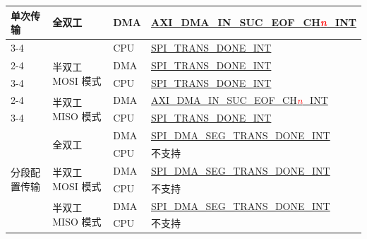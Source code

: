 \documentclass[main\_\_CN.tex]{subfiles}
\begin{document}
\begin{ThreePartTable}
\begin{longtable}[c]{|l|l|l|l|}
\multirow{6}{*}{单次传输} & \multirow{2}{*}{全双工} & DMA & \hyperref[int:GDMAINSUCEOFINT]{AXI\_DMA\_IN\_SUC\_EOF\_CH\textcolor{red}{\it{n}}\_INT} \tnote{1} \\ \cline{3-4}  
&& CPU & \hyperref[int:SPITRANSDONEINT]{SPI\_TRANS\_DONE\_INT} \tnote{2}  \\ \cline{2-4} 
& \multirow{2}{*}{半双工 MOSI 模式} & DMA & \hyperref[int:SPITRANSDONEINT]{SPI\_TRANS\_DONE\_INT} \\ \cline{3-4} 
&& CPU & \hyperref[int:SPITRANSDONEINT]{SPI\_TRANS\_DONE\_INT}  \\ \cline{2-4} 
& \multirow{2}{*}{半双工 MISO 模式} & DMA & \hyperref[int:GDMAINSUCEOFINT]{AXI\_DMA\_IN\_SUC\_EOF\_CH\textcolor{red}{\it{n}}\_INT} \\ \cline{3-4} 
&& CPU & \hyperref[int:SPITRANSDONEINT]{SPI\_TRANS\_DONE\_INT} \\ \hline
\multirow{6}{*}{分段配置传输} & \multirow{2}{*}{全双工} & DMA & \hyperref[int:SPIDMASEGTRANSDONEINT]{SPI\_DMA\_SEG\_TRANS\_DONE\_INT} \tnote{3} \\ \cline{3-4} 
&& CPU & 不支持       \\ \cline{2-4} 
& \multirow{2}{*}{半双工 MOSI 模式} & DMA  & \hyperref[int:SPIDMASEGTRANSDONEINT]{SPI\_DMA\_SEG\_TRANS\_DONE\_INT} \\ \cline{3-4} 
&& CPU           & 不支持       \\ \cline{2-4} 
& \multirow{2}{*}{半双工 MISO 模式} & DMA & \hyperref[int:SPIDMASEGTRANSDONEINT]{SPI\_DMA\_SEG\_TRANS\_DONE\_INT} \\ \cline{3-4} 
&& CPU & 不支持       \\ \hline
\end{longtable}
\end{ThreePartTable}
\end{document}

